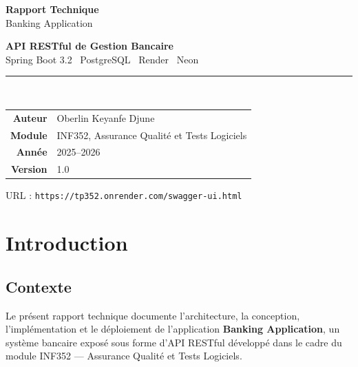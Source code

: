 \documentclass[12pt,a4paper]{article}
\begin{document}
\begin{titlepage}
    \begin{center}
        \vspace*{2cm}
        
        {\color{primary}\Huge\bfseries Rapport Technique\\[0.5cm]}
        {\color{secondary}\LARGE Banking Application\\[1cm]}
        
        {\Large\bfseries API RESTful de Gestion Bancaire\\[0.5cm]}
        {\large Spring Boot 3.2 \textbullet\ PostgreSQL \textbullet\ Render \textbullet\ Neon\\[2cm]}
        
        \rule{\textwidth}{0.8pt}\\[1.5cm]
        
        \begin{tabular}{rl}
            \textbf{Auteur} & Oberlin Keyanfe Djune \\[0.3em]
            \textbf{Module} & INF352, Assurance Qualité et Tests Logiciels \\[0.3em]
            \textbf{Année} & 2025--2026 \\[0.3em]
            \textbf{Version} & 1.0 \\
        \end{tabular}
        
        \vfill
        
        {\small URL : \texttt{https://tp352.onrender.com/swagger-ui.html}}
    \end{center}
\end{titlepage}

\section{Introduction}

\subsection{Contexte}
Le présent rapport technique documente l'architecture, la conception, l'implémentation et le déploiement de l'application \textbf{Banking Application}, un système bancaire exposé sous forme d'API RESTful développé dans le cadre du module INF352 --- Assurance Qualité et Tests Logiciels.
\end{document}
